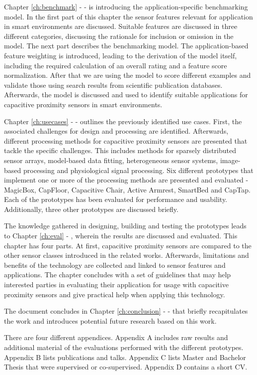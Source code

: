 Chapter \ref{ch:benchmark} - \emph{} - is introducing the application-specific benchmarking model. In the first part of this chapter the sensor features relevant for application in smart environments are discussed. Suitable features are discussed in three different categories, discussing the rationale for inclusion or omission in the model. The next part describes the benchmarking model. The application-based feature weighting is introduced, leading to the derivation of the model itself, including the required calculation of an overall rating and a feature score normalization. After that we are using the model to score different examples and validate those using search results from scientific publication databases. Afterwards, the model is discussed and used to identify suitable applications for capacitive proximity sensors in smart environments.

Chapter \ref{ch:usecases} - \emph{} - outlines the previously identified use cases. First, the  associated challenges for design and processing are identified. Afterwards, different processing methods for capacitive proximity sensors are presented that tackle the specific challenges. This includes methods for sparsely distributed sensor arrays, model-based data fitting, heterogeneous sensor systems, image-based processing and physiological signal processing. Six different prototypes that implement one or more of the processing methods are presented and evaluated - MagicBox, CapFloor, Capacitive Chair,  Active Armrest, SmartBed and CapTap. Each of the prototypes has been evaluated for performance and usability. Additionally, three other prototypes are discussed briefly.

The knowledge gathered in designing, building and testing the prototypes leads to Chapter \ref{ch:eval} - \emph{}, wherein the results are discussed and evaluated. This chapter has four parts. At first, capacitive proximity sensors are compared to the other sensor classes introduced in the related works. Afterwards, limitations and benefits of the technology are collected and linked to sensor features and applications. The chapter concludes with a set of guidelines that may help interested parties in evaluating their application for usage with capacitive proximity sensors and give practical help when applying this technology.

The document concludes in Chapter \ref{ch:conclusion} - \emph{} - that briefly recapitulates the work and introduces potential future research based on this work.

There are four different appendices. Appendix A includes raw results and additional material of the evaluations performed with the different prototypes. Appendix B lists publications and talks. Appendix C lists Master and Bachelor Thesis that were supervised or co-supervised. Appendix D contains a short CV.